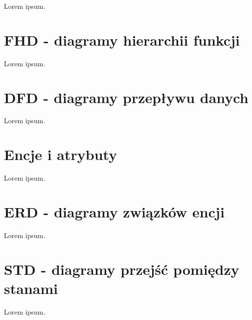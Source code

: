 Lorem ipsum.


\section{FHD - diagramy hierarchii funkcji}
\label{sec:FHD}

Lorem ipsum.


\section{DFD - diagramy przepływu danych}
\label{sec:DFD}

Lorem ipsum.


\section{Encje i atrybuty}
\label{sec:encje}

Lorem ipsum.


\section{ERD - diagramy związków encji}
\label{sec:ERD}

Lorem ipsum.


\section{STD - diagramy przejść pomiędzy stanami}
\label{sec:STD}

Lorem ipsum.